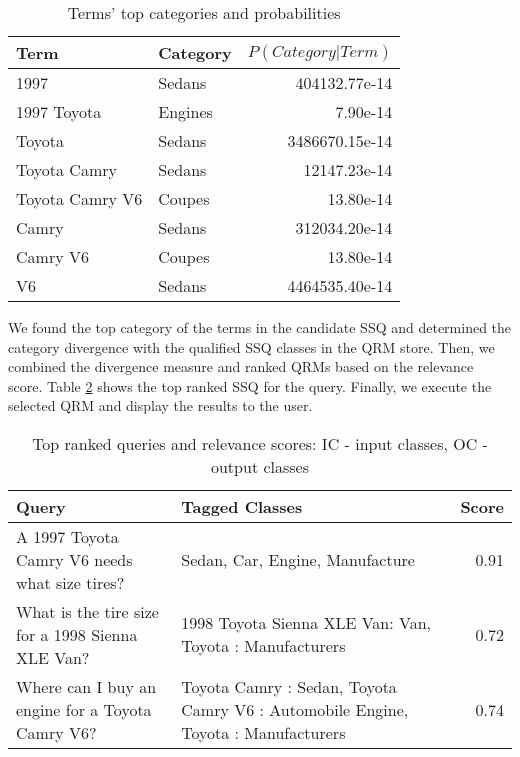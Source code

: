 \begin{table}[h]\footnotesize

\begin{tabular}{| p{3.2cm} | l | r |}
\hline 
Term & Category & $P(Category|Term)$ \\ \hline
1997 & Sedans & 404132.77e-14\\ 
1997 Toyota & Engines & 7.90e-14\\ 
Toyota  & Sedans & 3486670.15e-14\\ 
Toyota Camry & Sedans & 12147.23e-14\\ 
Toyota Camry V6 & Coupes & 13.80e-14\\ 
Camry & Sedans & 312034.20e-14\\ 
Camry V6 & Coupes & 13.80e-14\\ 
V6 & Sedans & 4464535.40e-14\\ \hline
\end{tabular}        

\caption{Terms' top categories and probabilities}
\label{tbl:term_categories}   

\end{table}

We found the top category of the terms in the candidate SSQ and determined the category divergence with the qualified SSQ classes in the QRM store. Then, we combined the divergence measure and
ranked QRMs based on the relevance score. Table \ref{tbl:ranked_queries} shows the top ranked SSQ for the query.  Finally, we execute the selected QRM and display the results to the user.

\begin{table}[h]\footnotesize

\begin{tabular}{| p{3.5cm} | p{3cm} | r |}
	\hline
	Query & Tagged Classes & Score\\ 
	\hline
	A 1997 Toyota Camry V6 needs what size tires? & Sedan, Car, Engine, Manufacture & 0.91\\ 
	\hline 
	What is the tire size for a 1998 Sienna XLE Van? & 1998 Toyota Sienna XLE Van: Van, Toyota : Manufacturers & 0.72\\
	\hline 
	Where can I buy an engine for a Toyota Camry V6? & Toyota Camry : Sedan, Toyota Camry V6 : Automobile Engine, Toyota : Manufacturers & 0.74 \\
	\hline 
\end{tabular}

\caption{Top ranked queries and relevance scores: IC - input classes, OC - output classes}
\label{tbl:ranked_queries}   

\end{table}


